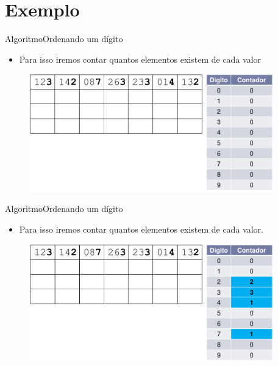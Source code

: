 \documentclass[aspectratio=169]{beamer}
\begin{document}
\section{Exemplo}

\begin{frame}{Algoritmo}{Ordenando um dígito}
\begin{itemize}
\item Para isso iremos contar quantos elementos existem de cada valor
\end{itemize}
\begin{figure}[!h]
  \centering
  \includegraphics[width=300pt]{imgs/radix1.png}
  \label{radix1}
\end{figure}
\end{frame}

\begin{frame}{Algoritmo}{Ordenando um dígito}
\begin{itemize}
\item Para isso iremos contar quantos elementos existem de cada valor.
\end{itemize}
\begin{figure}[!h]
  \centering
  \includegraphics[width=300pt]{imgs/radix2.png}
  \label{radix2}
\end{figure}
\end{frame}
\end{document}
